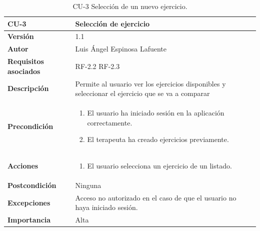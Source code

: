 \begin{table}[p]
	\centering
	\begin{tabularx}{\linewidth}{ p{} p{} }
		\toprule
		\textbf{CU-3}    & \textbf{Selección de ejercicio}\\
		\toprule
		\textbf{Versión}              & 1.1    \\
		\textbf{Autor}                &  Luis Ángel Espinosa Lafuente \\
		\textbf{Requisitos asociados} & RF-2.2 RF-2.3 \\
		\textbf{Descripción}          & Permite al usuario ver los ejercicios disponibles y seleccionar el ejercicio que se va a comparar\\
		\textbf{Precondición}         & 
		\begin{enumerate}		
			\def\labelenumi{\arabic{enumi}.}
			\tightlist
			\item El usuario ha iniciado sesión en la aplicación correctamente.
			\item El terapeuta ha creado ejercicios previamente.
		\end{enumerate}\\
		\textbf{Acciones}             &
		\begin{enumerate}
			\def\labelenumi{\arabic{enumi}.}
			\tightlist
			\item El usuario selecciona un ejercicio de un listado.
		\end{enumerate}\\
		\textbf{Postcondición}        & Ninguna \\
		\textbf{Excepciones}          & Acceso no autorizado en el caso de que el usuario no haya iniciado sesión. \\
		\textbf{Importancia}          & Alta \\
		\bottomrule
	\end{tabularx}
	\caption{CU-3 Selección de un nuevo ejercicio.}
\end{table}

